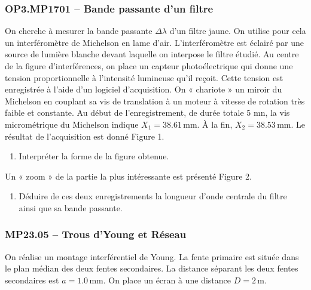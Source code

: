 \newpage
\subsubsection*{OP3.MP1701 -- Bande passante d'un filtre  \corrige}

On cherche à mesurer la bande passante $\Delta\lambda$ d'un filtre jaune. On utilise pour cela un interféromètre de Michelson en lame d'air. L'interféromètre est éclairé par une source de lumière blanche devant laquelle on interpose le filtre étudié. Au centre de la figure d'interférences, on place un capteur photoélectrique qui donne une tension proportionnelle à l'intensité lumineuse qu'il reçoit. Cette tension est enregistrée à l'aide d'un logiciel d'acquisition. On « chariote » un miroir du Michelson en couplant sa vis de translation à un moteur à vitesse de rotation très faible et constante. Au début de l'enregistrement, de durée totale 5 mn, la vis micrométrique du Michelson indique $X_{1} = 38.61\,\text{mm}$. À la fin, $X_{2} = 38.53\,\text{mm}$. Le résultat de l'acquisition est donné Figure 1.
\begin{center}
\end{center}
\begin{enumerate}
\item Interpréter la forme de la figure obtenue.
\end{enumerate}
Un « zoom » de la partie la plus intéressante est présenté Figure 2.
\begin{center}
\end{center}
\begin{enumerate}[resume]
\item Déduire de ces deux enregistrements la longueur d'onde centrale du filtre ainsi que sa bande passante.
\end{enumerate}

\newpage
\subsubsection*{MP23.05 -- Trous d'Young et Réseau }

On réalise un montage interférentiel de Young. La fente primaire est située dans le plan médian des deux fentes secondaires. La distance séparant les deux fentes secondaires est $a = 1.0\,\text{mm}$. On place un écran à une distance $D = 2\,\text{m}$.

